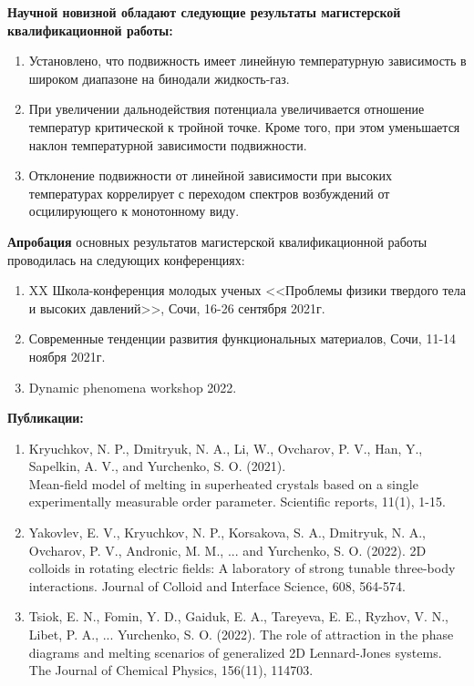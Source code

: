 \textbf{Научной новизной обладают следующие результаты магистерской
квалификационной работы:}
\begin{enumerate}
    \item Установлено, что подвижность имеет линейную температурную зависимость в широком диапазоне на бинодали жидкость-газ.
    \item При увеличении дальнодействия потенциала увеличивается отношение температур критической к тройной точке. Кроме того, при этом уменьшается наклон температурной зависимости подвижности.
    \item Отклонение подвижности от линейной зависимости при высоких температурах коррелирует с переходом спектров возбуждений от осцилирующего к монотонному виду.
\end{enumerate}


\textbf{Апробация} основных результатов магистерской квалификационной работы проводилась на следующих конференциях:
\begin{enumerate}
    \item XX Школа-конференция молодых ученых <<Проблемы физики твердого тела и высоких давлений>>, Сочи, 16-26 сентября 2021г.
    \item Современные тенденции развития функциональных материалов, Сочи, 11-14 ноября 2021г.
    \item Dynamic phenomena workshop 2022.
\end{enumerate}


\textbf{Публикации:}
\begin{enumerate}
    \item Kryuchkov, N. P., Dmitryuk, N. A., Li, W., Ovcharov, P. V., Han, Y., Sapelkin, A. V., and Yurchenko, S. O. (2021). \\ Mean-field model of melting in superheated crystals based on a single \\ experimentally measurable order parameter. Scientific reports, 11(1), 1-15.
    \item Yakovlev, E. V., Kryuchkov, N. P., Korsakova, S. A., Dmitryuk, N. A., Ovcharov, P. V., Andronic, M. M., ... and Yurchenko, S. O. (2022). 2D colloids in rotating electric fields: A laboratory of strong tunable three-body interactions. Journal of Colloid and Interface Science, 608, 564-574.
    \item Tsiok, E. N., Fomin, Y. D., Gaiduk, E. A., Tareyeva, E. E., Ryzhov, V. N., Libet, P. A., ... Yurchenko, S. O. (2022). The role of attraction in the phase diagrams and melting scenarios of generalized 2D Lennard-Jones systems. The Journal of Chemical Physics, 156(11), 114703.
\end{enumerate}
